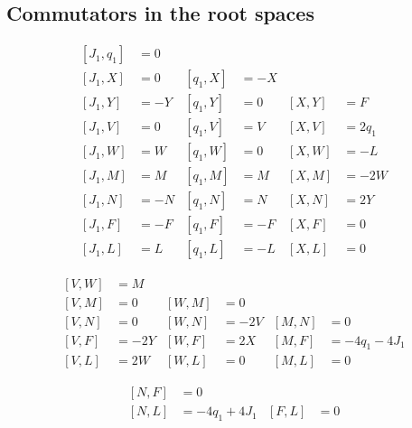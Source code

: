 \subsection{Commutators in the root spaces}

\begin{subequations}
	\begin{align}
		[J_1,q_1] & =0                                  \\
		[J_1,X]   & =0  & [q_1,X] & =-X                 \\
		[J_1,Y]   & =-Y & [q_1,Y] & =0  & [X,Y] & =F    \\
		[J_1,V]   & =0  & [q_1,V] & =V  & [X,V] & =2q_1 \\
		[J_1,W]   & =W  & [q_1,W] & =0  & [X,W] & =-L   \\
		[J_1,M]   & =M  & [q_1,M] & =M  & [X,M] & =-2W  \\
		[J_1,N]   & =-N & [q_1,N] & =N  & [X,N] & =2Y   \\
		[J_1,F]   & =-F & [q_1,F] & =-F & [X,F] & =0    \\
		[J_1,L]   & =L  & [q_1,L] & =-L & [X,L] & =0
	\end{align}
\end{subequations}

\begin{subequations}
	\begin{align}
		[V,W] & =M                                        \\
		[V,M] & =0   & [W,M] & =0                         \\
		[V,N] & =0   & [W,N] & =-2V & [M,N] & =0          \\
		[V,F] & =-2Y & [W,F] & =2X  & [M,F] & =-4q_1-4J_1 \\
		[V,L] & =2W  & [W,L] & =0   & [M,L] & =0
	\end{align}
\end{subequations}


\begin{subequations}
	\begin{align}
		[N,F] & =0                       \\
		[N,L] & =-4q_1+4J_1 & [F,L] & =0
	\end{align}
\end{subequations}


